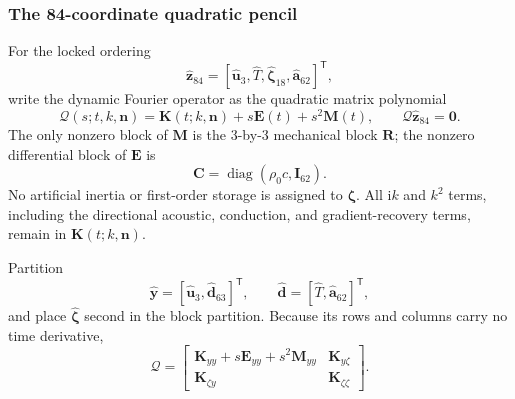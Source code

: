 \subsubsection{The 84-coordinate quadratic pencil}

For the locked ordering
\begin{equation}
 \widehat{\boldsymbol z}_{84}
 =
 \left[
  \widehat{\boldsymbol u}_3,
  \widehat T,
  \widehat{\boldsymbol\zeta}_{18},
  \widehat{\boldsymbol a}_{62}
 \right]^{\mathsf T},
 \label{eq:dyn_84_state}
\end{equation}
write the dynamic Fourier operator as the quadratic matrix polynomial
\begin{equation}
 \boldsymbol{\mathcal Q}
 (s;t,k,\boldsymbol n)
 =
 \boldsymbol K(t;k,\boldsymbol n)
 +s\boldsymbol E(t)
 +s^2\boldsymbol M(t),
 \qquad
 \boldsymbol{\mathcal Q}\widehat{\boldsymbol z}_{84}=\boldsymbol0.
 \label{eq:dyn_quadratic_pencil}
\end{equation}
The only nonzero block of $\boldsymbol M$ is the 3-by-3 mechanical block
$\boldsymbol R$; the nonzero differential block of $\boldsymbol E$ is
\begin{equation}
 \boldsymbol C
 =\operatorname{diag}(\rho_0c,\boldsymbol I_{62}).
 \label{eq:dyn_mass_storage_blocks}
\end{equation}
No artificial inertia or first-order storage is assigned to
$\boldsymbol\zeta$.  All $\mathrm{i}k$ and $k^2$ terms, including the
directional acoustic, conduction, and gradient-recovery terms, remain in
$\boldsymbol K(t;k,\boldsymbol n)$.

Partition
\begin{equation}
 \widehat{\boldsymbol y}
 =
 [\widehat{\boldsymbol u}_3,\widehat{\boldsymbol d}_{63}]^{\mathsf T},
 \qquad
 \widehat{\boldsymbol d}
 =
 [\widehat T,\widehat{\boldsymbol a}_{62}]^{\mathsf T},
 \label{eq:dyn_retained_state}
\end{equation}
and place $\widehat{\boldsymbol\zeta}$ second in the block partition.  Because
its rows and columns carry no time derivative,
\begin{equation}
 \boldsymbol{\mathcal Q}
 =
 \begin{bmatrix}
  \boldsymbol K_{yy}+s\boldsymbol E_{yy}+s^2\boldsymbol M_{yy}
    & \boldsymbol K_{y\zeta}\\
  \boldsymbol K_{\zeta y} & \boldsymbol K_{\zeta\zeta}
 \end{bmatrix}.
 \label{eq:dyn_partitioned_pencil}
\end{equation}

